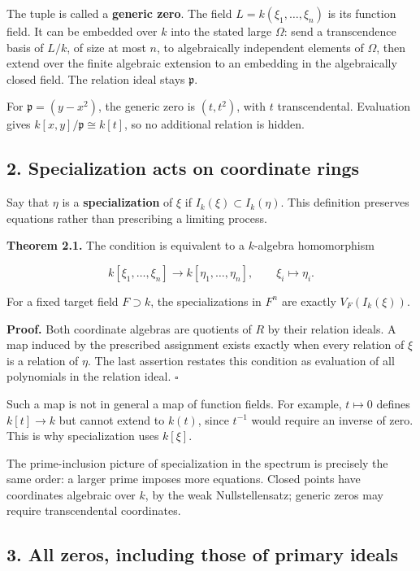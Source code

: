 \documentclass[
]{article}
\begin{document}
The tuple is called a \textbf{generic zero}. The field
\(L=k(\xi_1,\ldots,\xi_n)\) is its function field. It can be embedded
over \(k\) into the stated large \(\Omega\): send a transcendence basis
of \(L/k\), of size at most \(n\), to algebraically independent elements
of \(\Omega\), then extend over the finite algebraic extension to an
embedding in the algebraically closed field. The relation ideal stays
\(\mathfrak p\).

For \(\mathfrak p=(y-x^2)\), the generic zero is \((t,t^2)\), with \(t\)
transcendental. Evaluation gives \(k[x,y]/\mathfrak p\cong k[t]\), so no
additional relation is hidden.

\subsection{2. Specialization acts on coordinate
rings}\label{specialization-acts-on-coordinate-rings}

Say that \(\eta\) is a \textbf{specialization} of \(\xi\) if
\(I_k(\xi)\subset I_k(\eta)\). This definition preserves equations
rather than prescribing a limiting process.

\textbf{Theorem 2.1.} The condition is equivalent to a \(k\)-algebra
homomorphism

\[
k[\xi_1,\ldots,\xi_n]\longrightarrow k[\eta_1,\ldots,\eta_n],
\qquad \xi_i\longmapsto\eta_i.
\]

For a fixed target field \(F\supset k\), the specializations in \(F^n\)
are exactly \(V_F(I_k(\xi))\).

\textbf{Proof.} Both coordinate algebras are quotients of \(R\) by their
relation ideals. A map induced by the prescribed assignment exists
exactly when every relation of \(\xi\) is a relation of \(\eta\). The
last assertion restates this condition as evaluation of all polynomials
in the relation ideal. \(\square\)

Such a map is not in general a map of function fields. For example,
\(t\mapsto0\) defines \(k[t]\to k\) but cannot extend to \(k(t)\), since
\(t^{-1}\) would require an inverse of zero. This is why specialization
uses \(k[\xi]\).

The prime-inclusion picture of specialization in the spectrum is
precisely the same order: a larger prime imposes more equations. Closed
points have coordinates algebraic over \(k\), by the weak
Nullstellensatz; generic zeros may require transcendental coordinates.

\subsection{3. All zeros, including those of primary
ideals}\label{all-zeros-including-those-of-primary-ideals}
\end{document}
